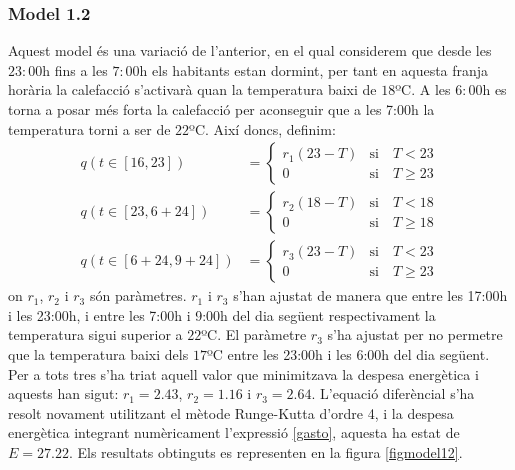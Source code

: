 \documentclass[11pt]{article}
\begin{document}
	\subsubsection*{Model 1.2}
	Aquest model és una variació de l'anterior, en el qual considerem que desde les $23:00$h fins a les $7:00$h els habitants estan dormint, per tant en aquesta franja horària la calefacció s'activarà quan la temperatura baixi de $18$ºC. A les $6:00$h es torna a posar més forta la calefacció per aconseguir que a les 7:00h la temperatura torni a ser de $22$ºC. Així doncs, definim:
\begin{align} 
q(t\in[16,23])&=
\begin{cases}
r_1(23-T)&\text{si}\quad T<23\\
0&\text{si}\quad T\geq23
\end{cases}
\\
q(t\in[23,6+24])&=
\begin{cases}
r_2(18-T)&\text{si}\quad T<18\\
0&\text{si}\quad T\geq18
\end{cases}
\\
q(t\in[6+24,9+24])&=
\begin{cases}
r_3(23-T)&\text{si}\quad T<23\\
0&\text{si}\quad T\geq23
\end{cases}
\end{align}
on $r_1$, $r_2$ i $r_3$ són paràmetres. $r_1$ i $r_3$ s'han ajustat de manera que entre les 17:00h i les 23:00h, i entre les 7:00h i 9:00h del dia següent respectivament la temperatura sigui superior a $22$ºC. El paràmetre $r_3$ s'ha ajustat per no permetre que la temperatura baixi dels $17$ºC entre les 23:00h i les 6:00h del dia següent. Per a tots tres s'ha triat aquell valor que minimitzava la despesa energètica i aquests han sigut: $r_1=2.43$, $r_2=1.16$ i $r_3=2.64$. L'equació diferèncial s'ha resolt novament utilitzant el mètode Runge-Kutta d'ordre 4, i la despesa energètica integrant numèricament l'expressió \eqref{gasto}, aquesta ha estat de $E=27.22$. Els resultats obtinguts es representen en la figura \ref{figmodel12}.\\
\end{document}
